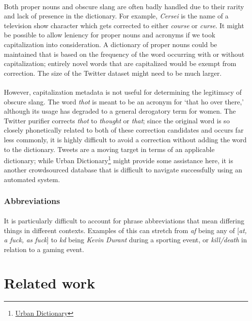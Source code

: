 \documentclass[twocolumn,10pt]{article}
\begin{document}
\paragraph{} Both proper nouns and obscure slang are often badly handled due to their rarity and lack of presence in the dictionary. For example, \textit{Cersei} is the name of a television show character which gets corrected to either \textit{course} or \textit{curse}. It might be possible to allow leniency for proper nouns and acronyms if we took capitalization into consideration. A dictionary of proper nouns could be maintained that is based on the frequency of the word occurring with or without capitalization; entirely novel words that are capitalized would be exempt from correction. The size of the Twitter dataset might need to be much larger.
\paragraph{} However, capitalization metadata is not useful for determining the legitimacy of obscure slang. The word \textit{thot} is meant to be an acronym for `that ho over there,' although its usage has degraded to a general derogatory term for women. The Twitter purifier corrects \textit{thot} to \textit{thought} or \textit{that}; since the original word is so closely phonetically related to both of these correction candidates and occurs far less commonly, it is highly difficult to avoid a correction without adding the word to the dictionary. Tweets are a moving target in terms of an applicable dictionary; while Urban Dictionary\footnote{\href{http://www.urbandictionary.com/}{Urban Dictionary}} might provide some assistance here, it is another crowdsourced database that is difficult to navigate successfully using an automated system.
\subsubsection*{Abbreviations}
\paragraph{}It is particularly difficult to account for phrase abbreviations that mean differing things in different contexts. Examples of this can stretch from \textit{af} being any of [\textit{at, a fuck, as fuck}] to \textit{kd} being \textit{Kevin Durant} during a sporting event, or \textit{kill/death} in relation to a gaming event.

\section*{Related work}
\end{document}
